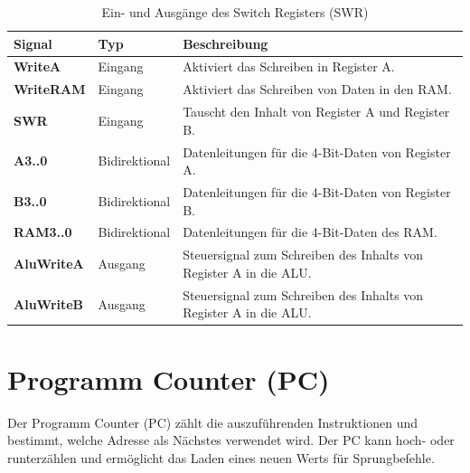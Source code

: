 \begin{table}[H]
  \centering
  \begin{tabular}{|l|l|p{9cm}|}
    \hline
    \textbf{Signal}    & \textbf{Typ}  & \textbf{Beschreibung}                                             \\ \hline
    \textbf{WriteA}    & Eingang       & Aktiviert das Schreiben in Register A.                            \\ \hline
    \textbf{WriteRAM}  & Eingang       & Aktiviert das Schreiben von Daten in den RAM.                     \\ \hline
    \textbf{SWR}       & Eingang       & Tauscht den Inhalt von Register A und Register B.                 \\ \hline
    \textbf{A3..0}     & Bidirektional & Datenleitungen für die 4-Bit-Daten von Register A.                \\ \hline
    \textbf{B3..0}     & Bidirektional & Datenleitungen für die 4-Bit-Daten von Register B.                \\ \hline
    \textbf{RAM3..0}   & Bidirektional & Datenleitungen für die 4-Bit-Daten des RAM.                       \\ \hline
    \textbf{AluWriteA} & Ausgang       & Steuersignal zum Schreiben des Inhalts von Register A in die ALU. \\ \hline
    \textbf{AluWriteB} & Ausgang       & Steuersignal zum Schreiben des Inhalts von Register A in die ALU. \\ \hline
  \end{tabular}
  \caption{Ein- und Ausgänge des Switch Registers (SWR)}
  \label{tab:SWR}
\end{table}


\section{Programm Counter (PC)}
\label{sec:programm-counter}

Der Programm Counter (PC) zählt die auszuführenden Instruktionen und bestimmt, welche Adresse als Nächstes
verwendet wird. Der PC kann hoch- oder runterzählen und ermöglicht das Laden eines neuen Werts für
Sprungbefehle.

